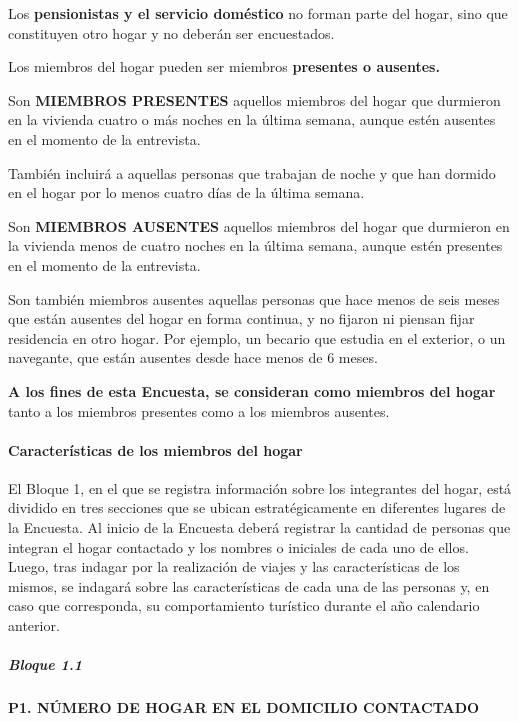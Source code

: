 \documentclass[
  openany]{book}
\begin{document}
Los \textbf{pensionistas y el servicio doméstico} no forman parte del hogar, sino que constituyen otro hogar y no deberán ser encuestados.

Los miembros del hogar pueden ser miembros \textbf{presentes o ausentes.}

Son \textbf{MIEMBROS PRESENTES} aquellos miembros del hogar que durmieron en la vivienda cuatro o más noches en la última semana, aunque estén ausentes en el momento de la entrevista.

También incluirá a aquellas personas que trabajan de noche y que han dormido en el hogar por lo menos cuatro días de la última semana.

Son \textbf{MIEMBROS AUSENTES} aquellos miembros del hogar que durmieron en la vivienda menos de cuatro noches en la última semana, aunque estén presentes en el momento de la entrevista.

Son también miembros ausentes aquellas personas que hace menos de seis meses que están ausentes del hogar en forma continua, y no fijaron ni piensan fijar residencia en otro hogar. Por ejemplo, un becario que estudia en el exterior, o un navegante, que están ausentes desde hace menos de 6 meses.

\textbf{A los fines de esta Encuesta, se consideran como miembros del hogar} tanto a los miembros presentes como a los miembros ausentes.

\hypertarget{caracteruxedsticas-de-los-miembros-del-hogar}{%
\paragraph{Características de los miembros del hogar}\label{caracteruxedsticas-de-los-miembros-del-hogar}}

El Bloque 1, en el que se registra información sobre los integrantes del hogar, está dividido en tres secciones que se ubican estratégicamente en diferentes lugares de la Encuesta. Al inicio de la Encuesta deberá registrar la cantidad de personas que integran el hogar contactado y los nombres o iniciales de cada uno de ellos. Luego, tras indagar por la realización de viajes y las características de los mismos, se indagará sobre las características de cada una de las personas y, en caso que corresponda, su comportamiento turístico durante el año calendario anterior.

\hypertarget{bloque-1.1}{%
\subparagraph{Bloque 1.1}\label{bloque-1.1}}

\textbf{P1. NÚMERO DE HOGAR EN EL DOMICILIO CONTACTADO}
\end{document}
